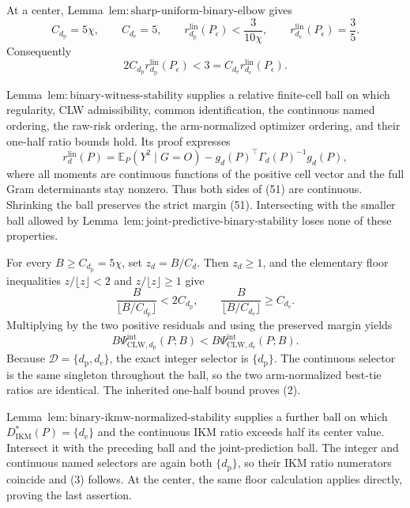 At a center, Lemma~\(\mathrm{lem{:}sharp\text{-}uniform\text{-}binary\text{-}elbow}\) gives
\[
 C_{d_{\mathrm p}}=5\chi,
 \qquad C_{d_{\mathrm e}}=5,
 \qquad
 r_{d_{\mathrm p}}^{\mathrm{lin}}(P_\epsilon)<\frac3{10\chi},
 \qquad
 r_{d_{\mathrm e}}^{\mathrm{lin}}(P_\epsilon)=\frac35.
\]
Consequently
\[
 2C_{d_{\mathrm p}}r_{d_{\mathrm p}}^{\mathrm{lin}}(P_\epsilon)
 <3=C_{d_{\mathrm e}}r_{d_{\mathrm e}}^{\mathrm{lin}}(P_\epsilon). \tag{51}
\]

Lemma~\(\mathrm{lem{:}binary\text{-}witness\text{-}stability}\) supplies a relative finite-cell ball on which regularity, CLW admissibility, common identification, the continuous named ordering, the raw-risk ordering, the arm-normalized optimizer ordering, and their one-half ratio bounds hold.  Its proof expresses
\[
 r_d^{\mathrm{lin}}(P)=
 \mathbb E_P(Y^2\mid G=O)-g_d(P)^\top\Gamma_d(P)^{-1}g_d(P),
\]
where all moments are continuous functions of the positive cell vector and the full Gram determinants stay nonzero.  Thus both sides of (51) are continuous.  Shrinking the ball preserves the strict margin (51).  Intersecting with the smaller ball allowed by Lemma~\(\mathrm{lem{:}joint\text{-}predictive\text{-}binary\text{-}stability}\) loses none of these properties.

For every \(B\ge C_{d_{\mathrm p}}=5\chi\), set \(z_d=B/C_d\).  Then \(z_d\ge1\), and the elementary floor inequalities \(z/\lfloor z\rfloor<2\) and \(z/\lfloor z\rfloor\ge1\) give
\[
 \frac{B}{\lfloor B/C_{d_{\mathrm p}}\rfloor}<2C_{d_{\mathrm p}},
 \qquad
 \frac{B}{\lfloor B/C_{d_{\mathrm e}}\rfloor}\ge C_{d_{\mathrm e}}. \tag{52}
\]
Multiplying by the two positive residuals and using the preserved margin yields
\[
 B\Psi_{\mathrm{CLW},d_{\mathrm p}}^{\mathrm{int}}(P;B)
 <B\Psi_{\mathrm{CLW},d_{\mathrm e}}^{\mathrm{int}}(P;B).
\]
Because \(\mathcal D=\{d_{\mathrm p},d_{\mathrm e}\}\), the exact integer selector is \(\{d_{\mathrm p}\}\).  The continuous selector is the same singleton throughout the ball, so the two arm-normalized best-tie ratios are identical.  The inherited one-half bound proves (2).

Lemma~\(\mathrm{lem{:}binary\text{-}ikmw\text{-}normalized\text{-}stability}\) supplies a further ball on which \(D_{\mathrm{IKM}}^*(P)=\{d_{\mathrm e}\}\) and the continuous IKM ratio exceeds half its center value.  Intersect it with the preceding ball and the joint-prediction ball.  The integer and continuous named selectors are again both \(\{d_{\mathrm p}\}\), so their IKM ratio numerators coincide and (3) follows.  At the center, the same floor calculation applies directly, proving the last assertion.